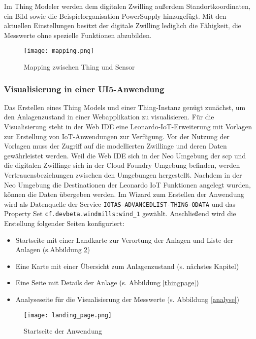 \noindent Im Thing Modeler werden dem digitalen Zwilling außerdem Standortkoordinaten, ein Bild sowie die Beispielorganisation PowerSupply hinzugefügt. Mit den aktuellen Einstellungen besitzt der digitale Zwilling lediglich die Fähigkeit, die Messwerte ohne spezielle Funktionen abzubilden.

\begin{figure} [H]
  \centering
  \texttt{[image: mapping.png]}
  \caption{Mapping zwischen Thing und Sensor}
  \label{mapping}
\end{figure}

\subsubsection{Visualisierung in einer UI5-Anwendung}

Das Erstellen eines Thing Models und einer Thing-Instanz genügt zunächst, um den Anlagenzustand in einer Webapplikation zu visualisieren. Für die Visualisierung steht in der Web IDE eine Leonardo-IoT-Erweiterung mit Vorlagen zur Erstellung von IoT-Anwendungen zur Verfügung. Vor der Nutzung der Vorlagen muss der Zugriff auf  die modellierten Zwillinge und deren Daten gewährleistet werden. Weil die Web IDE sich in der Neo Umgebung der \ac{scp} und die digitalen Zwillinge sich in der Cloud Foundry Umgebung befinden, werden Vertrauensbeziehungen zwischen den Umgebungen hergestellt. Nachdem in der Neo Umgebung die Destinationen der Leonardo IoT Funktionen angelegt wurden, können die Daten übergeben werden. Im Wizard zum Erstellen der Anwendung wird als Datenquelle der Service \texttt{IOTAS-ADVANCEDLIST-THING-ODATA} und das Property Set \texttt{cf.devbeta.\-windmills:wind\_1} gewählt. Anschließend wird die Erstellung folgender Seiten konfiguriert:

\begin{itemize}
  \item Startseite mit einer Landkarte zur Verortung der Anlagen und Liste der Anlagen (s.Abbildung \ref{landing})
  \item Eine Karte mit einer Übersicht zum Anlagenzustand (s. nächstes Kapitel)
  \item Eine Seite mit Details der Anlage (s. Abbildung \ref{thingpage})
  \item Analyseseite für die Visualisierung der Messwerte (s. Abbildung \ref{analyse})
\end{itemize}

\begin{figure}[H]
  \centering
  \texttt{[image: landing\_page.png]}
  \caption{Startseite der Anwendung}
  \label{landing}
\end{figure}

